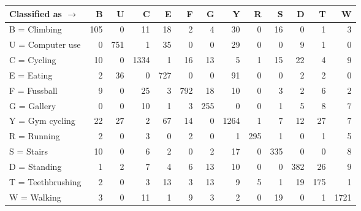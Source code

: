 \begin{tabular}{lrrrrrrrrrrrr}
\toprule
Classified as $\rightarrow$ &    B &    U &     C &    E &    F &    G &     Y &    R &    S &    D &    T &     W \\
\midrule
B = Climbing      &  105 &    0 &    11 &   18 &    2 &    4 &    30 &    0 &   16 &    0 &    1 &     3 \\
U = Computer use  &    0 &  751 &     1 &   35 &    0 &    0 &    29 &    0 &    0 &    9 &    1 &     0 \\
C = Cycling       &   10 &    0 &  1334 &    1 &   16 &   13 &     5 &    1 &   15 &   22 &    4 &     9 \\
E = Eating        &    2 &   36 &     0 &  727 &    0 &    0 &    91 &    0 &    0 &    2 &    2 &     0 \\
F = Fussball      &    9 &    0 &    25 &    3 &  792 &   18 &    10 &    0 &    3 &    2 &    6 &     2 \\
G = Gallery       &    0 &    0 &    10 &    1 &    3 &  255 &     0 &    0 &    1 &    5 &    8 &     7 \\
Y = Gym cycling   &   22 &   27 &     2 &   67 &   14 &    0 &  1264 &    1 &    7 &   12 &   27 &     7 \\
R = Running       &    2 &    0 &     3 &    0 &    2 &    0 &     1 &  295 &    1 &    0 &    1 &     5 \\
S = Stairs        &   10 &    0 &     6 &    2 &    0 &    2 &    17 &    0 &  335 &    0 &    0 &     8 \\
D = Standing      &    1 &    2 &     7 &    4 &    6 &   13 &    10 &    0 &    0 &  382 &   26 &     9 \\
T = Teethbrushing &    2 &    0 &     3 &   13 &    3 &   13 &     9 &    5 &    1 &   19 &  175 &     1 \\
W = Walking       &    3 &    0 &    11 &    1 &    9 &    3 &     2 &    0 &   19 &    0 &    1 &  1721 \\
\bottomrule
\end{tabular}
